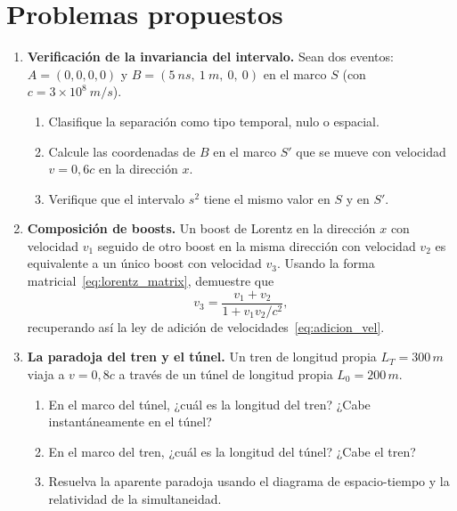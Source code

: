 \section{Problemas propuestos}

\begin{enumerate}[leftmargin=2em, label=\textbf{P\thechapter.\arabic*.}]

  \item \textbf{Verificación de la invariancia del intervalo.}
  Sean dos eventos: $A = (0, 0, 0, 0)$ y $B = (5\ \si{ns},\ 1\ \si{m},\ 0,\ 0)$ en el marco $S$ (con $c = 3\times10^8\ \si{m/s}$).
  \begin{enumerate}[label=(\alph*)]
    \item Clasifique la separación como tipo temporal, nulo o espacial.
    \item Calcule las coordenadas de $B$ en el marco $S'$ que se mueve con velocidad $v = 0{,}6c$ en la dirección $x$.
    \item Verifique que el intervalo $s^2$ tiene el mismo valor en $S$ y en $S'$.
  \end{enumerate}

  \item \textbf{Composición de boosts.}
  Un boost de Lorentz en la dirección $x$ con velocidad $v_1$ seguido de otro boost en la misma dirección con velocidad $v_2$ es equivalente a un único boost con velocidad $v_3$. Usando la forma matricial~\eqref{eq:lorentz_matrix}, demuestre que
  \[
    v_3 = \frac{v_1 + v_2}{1 + v_1 v_2/c^2},
  \]
  recuperando así la ley de adición de velocidades~\eqref{eq:adicion_vel}.

  \item \textbf{La paradoja del tren y el túnel.}
  Un tren de longitud propia $L_T = 300\,\si{m}$ viaja a $v = 0{,}8c$ a través de un túnel de longitud propia $L_0 = 200\,\si{m}$.
  \begin{enumerate}[label=(\alph*)]
    \item En el marco del túnel, ¿cuál es la longitud del tren? ¿Cabe instantáneamente en el túnel?
    \item En el marco del tren, ¿cuál es la longitud del túnel? ¿Cabe el tren?
    \item Resuelva la aparente paradoja usando el diagrama de espacio-tiempo y la relatividad de la simultaneidad.
  \end{enumerate}


\end{enumerate}
